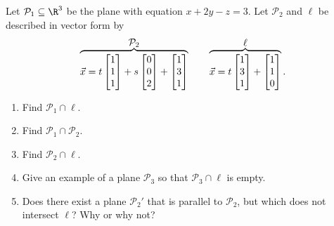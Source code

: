 \begin{exercises}
\begin{problist}
		\prob Let $\mathcal P_1\subseteq\R^3$ be the plane with equation $x+2y-z=3$. Let
		$\mathcal P_2$ and $\ell$ be described in vector form by
		\[
			\overbrace{\vec x=t\mat{1\\1\\1}+s\mat{0\\0\\2}+\mat{1\\3\\1}}^{\displaystyle \mathcal P_2}
			\qquad
			\overbrace{\vec x=t\mat{1\\3\\1}+\mat{1\\1\\0}}^{\displaystyle \ell}.
		\]
		\begin{enumerate}
			\item Find $\mathcal P_1\cap \ell$.
			\item Find $\mathcal P_1\cap \mathcal P_2$.
			\item Find $\mathcal P_2\cap \ell$.
			\item Give an example of a plane $\mathcal P_3$ so that
				$\mathcal P_3\cap\ell$ is empty.
			\item Does there exist a plane $\mathcal P_2'$ that is 
				parallel to $\mathcal P_2$, but which does not
				intersect $\ell$? Why or why not?
		\end{enumerate}


\end{problist}
\end{exercises}
